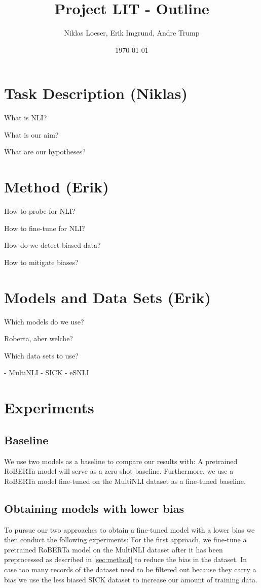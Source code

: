 \documentclass[12pt,a4paper]{article}
\title{Project LIT - Outline}
\author{Niklas Loeser, Erik Imgrund, Andre Trump}
\date{\today}
\begin{document}
\begin{acronym}
\end{acronym}

\maketitle

\section{Task Description (Niklas)}
What is NLI?

What is our aim?

What are our hypotheses?

\section{Method (Erik)}
\label{sec:method}

How to probe for NLI?

How to fine-tune for NLI?

How do we detect biased data?

How to mitigate biases?

\section{Models and Data Sets (Erik)}
Which models do we use?

Roberta, aber welche?

Which data sets to use?

- MultiNLI
- SICK
- eSNLI

\section{Experiments}
\subsection{Baseline}
We use two models as a baseline to compare our results with: A pretrained RoBERTa model will serve as a zero-shot baseline. Furthermore, we use a RoBERTa model fine-tuned on the MultiNLI dataset as a fine-tuned baseline.

\subsection{Obtaining models with lower bias}
To pursue our two approaches to obtain a fine-tuned model with a lower bias we then conduct the following experiments: For the first approach, we fine-tune a pretrained RoBERTa model on the MultiNLI dataset after it has been preprocessed as described in \autoref{sec:method} to reduce the bias in the dataset. In case too many records of the dataset need to be filtered out because they carry a bias we use the less biased SICK dataset to increase our amount of training data. 
\end{document}
